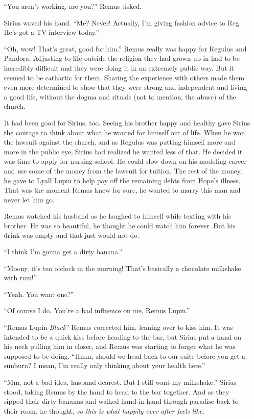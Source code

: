\documentclass[12pt,twoside,openright]{memoir}
\begin{document}
``You aren't working, are you?'' Remus tisked. 

Sirius waved his hand. ``Me? Never! Actually, I'm giving fashion advice to Reg. He's got a TV interview today.''

``Oh, wow! That's great, good for him.'' Remus really was happy for Regulus and Pandora. Adjusting to life outside the religion they had grown up in had to be incredibly difficult and they were doing it in an extremely public way. But it seemed to be cathartic for them. Sharing the experience with others made them even more determined to show that they were strong and independent and living a good life, without the dogma and rituals (not to mention, the abuse) of the church.

It had been good for Sirius, too. Seeing his brother happy and healthy gave Sirius the courage to think about what he wanted for himself out of life. When he won the lawsuit against the church, and as Regulus was putting himself more and more in the public eye, Sirius had realized he wanted less of that. He decided it was time to apply for nursing school. He could slow down on his modeling career and use some of the money from the lawsuit for tuition. The rest of the money, he gave to Lyall Lupin to help pay off the remaining debts from Hope's illness. That was the moment Remus knew for sure, he wanted to marry this man and never let him go.

Remus watched his husband as he laughed to himself while texting with his brother. He was so beautiful, he thought he could watch him forever. But his drink was empty and that just would not do. 

``I think I'm gonna get a dirty banana.''

``Moony, it's ten o'clock in the morning! That's basically a chocolate milkshake with rum!''

``Yeah. You want one?''

``Of course I do. You're a bad influence on me, Remus Lupin.'' 

``Remus Lupin-\textit{Black}'' Remus corrected him, leaning over to kiss him. It was intended to be a quick kiss before heading to the bar, but Sirius put a hand on his neck pulling him in closer, and Remus was starting to forget what he was supposed to be doing. ``Hmm, should we head back to our suite before you get a sunburn? I mean, I'm really only thinking about your health here.'' 

``Mm, not a bad idea, husband dearest. But I still want my milkshake.'' Sirius stood, taking Remus by the hand to head to the bar together. And as they sipped their dirty bananas and walked hand-in-hand through paradise back to their room, he thought, \textit{so this is what happily ever after feels like}. 
\end{document}
